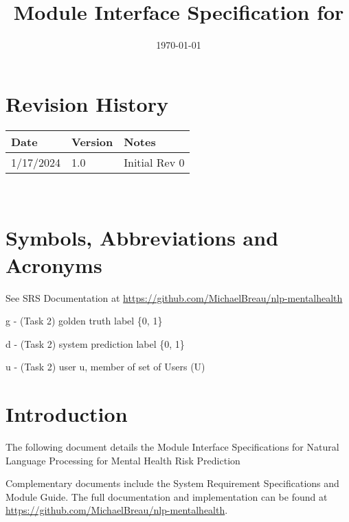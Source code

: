 \documentclass[12pt, titlepage]{article}
\begin{document}
\title{Module Interface Specification for \progname{}}

\author{\authname}

\date{\today}

\maketitle


\section{Revision History}

\begin{tabularx}{\textwidth}{p{3cm}p{2cm}X}
\toprule {\bf Date} & {\bf Version} & {\bf Notes}\\
\midrule
1/17/2024 & 1.0 & Initial Rev 0\\
\bottomrule
\end{tabularx}

~\newpage

\section{Symbols, Abbreviations and Acronyms}

See SRS Documentation at \url{https://github.com/MichaelBreau/nlp-mentalhealth}

g - (Task 2) golden truth label \{0, 1\}

d - (Task 2) system prediction label \{0, 1\}

u - (Task 2) user u, member of set of Users (U)

\newpage

\tableofcontents

\newpage


\section{Introduction}

The following document details the Module Interface Specifications for
Natural Language Processing for Mental Health Risk Prediction 

Complementary documents include the System Requirement Specifications
and Module Guide.  The full documentation and implementation can be
found at \url{https://github.com/MichaelBreau/nlp-mentalhealth}.
\end{document}
